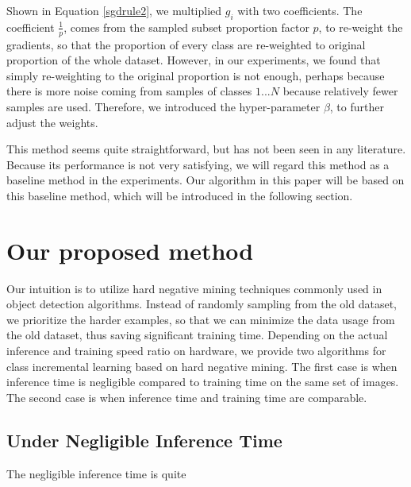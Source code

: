 Shown in Equation \ref{sgdrule2}, we multiplied $g_i$ with two coefficients. The coefficient $\frac{1}{p}$, comes from the sampled subset proportion factor $p$, to re-weight the gradients, so that the proportion of every class are re-weighted to original proportion of the whole dataset. However, in our experiments, we found that simply re-weighting to the original proportion is not enough, perhaps because there is more noise coming from samples of classes $1...N$ because relatively fewer samples are used. Therefore, we introduced the hyper-parameter $\beta$, to further adjust the weights.

This method seems quite straightforward, but has not been seen in any literature. Because its performance is not very satisfying, we will regard this method as a baseline method in the experiments. Our algorithm in this paper will be based on this baseline method, which will be introduced in the following section.


\section{Our proposed method}

Our intuition is to utilize hard negative mining techniques commonly used in object detection algorithms. Instead of randomly sampling from the old dataset, we prioritize the harder examples, so that we can minimize the data usage from the old dataset, thus saving significant training time. Depending on the actual inference and training speed ratio on hardware, we provide two algorithms for class incremental learning based on hard negative mining. The first case is when inference time is negligible compared to training time on the same set of images. The second case is when inference time and training time are comparable.

\subsection{Under Negligible Inference Time}

The negligible inference time is quite 





















